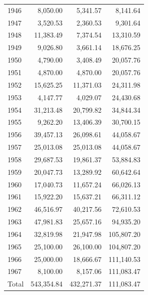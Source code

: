 \begin{longtable}{lrrr}
1946 & 8,050.00 & 5,341.57 & 8,141.64\\
1947 & 3,520.53 & 2,360.53 & 9,301.64\\
1948 & 11,383.49 & 7,374.54 & 13,310.59\\
1949 & 9,026.80 & 3,661.14 & 18,676.25\\
1950 & 4,790.00 & 3,408.49 & 20,057.76\\
1951 & 4,870.00 & 4,870.00 & 20,057.76\\
1952 & 15,625.25 & 11,371.03 & 24,311.98\\
1953 & 4,147.77 & 4,029.07 & 24,430.68\\
1954 & 31,213.48 & 20,799.82 & 34,844.34\\
1955 & 9,262.20 & 13,406.39 & 30,700.15\\
1956 & 39,457.13 & 26,098.61 & 44,058.67\\
1957 & 25,013.08 & 25,013.08 & 44,058.67\\
1958 & 29,687.53 & 19,861.37 & 53,884.83\\
1959 & 20,047.73 & 13,289.92 & 60,642.64\\
1960 & 17,040.73 & 11,657.24 & 66,026.13\\
1961 & 15,922.20 & 15,637.21 & 66,311.12\\
1962 & 46,516.97 & 40,217.56 & 72,610.53\\
1963 & 47,981.83 & 25,657.16 & 94,935.20\\
1964 & 32,819.98 & 21,947.98 & 105,807.20\\
1965 & 25,100.00 & 26,100.00 & 104,807.20\\
1966 & 25,000.00 & 18,666.67 & 111,140.53\\
1967 & 8,100.00 & 8,157.06 & 111,083.47\\
\midrule Total & 543,354.84 & 432,271.37 & 111,083.47\\\bottomrule\end{longtable}

